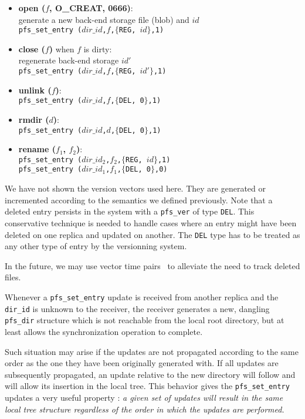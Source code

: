 \begin{itemize}
  \item \textbf{open ($f$, O\_CREAT, 0666)}: \\
    generate a new back-end storage file (blob) and $id$ \\
    {\tt pfs\_set\_entry ($dir\_id$,$f$,$\{$REG, $id$$\}$,1)}

  \item \textbf{close ($f$)} when $f$ is dirty: \\
    regenerate back-end storage $id'$ \\
    {\tt pfs\_set\_entry ($dir\_id$,$f$,$\{$REG, $id'$$\}$,1)}
    
  \item \textbf{unlink ($f$)}: \\
    {\tt pfs\_set\_entry ($dir\_id$,$f$,$\{$DEL, 0$\}$,1)}

  \item \textbf{rmdir ($d$)}: \\
    {\tt pfs\_set\_entry ($dir\_id$,$d$,$\{$DEL, 0$\}$,1)}

  \item \textbf{rename ($f_1$, $f_2$)}: \\
    {\tt pfs\_set\_entry ($dir\_id_2$,$f_2$,$\{$REG, $id$$\}$,1)} \\
    {\tt pfs\_set\_entry ($dir\_id_1$,$f_1$,$\{$DEL, 0$\}$,0)}
\end{itemize}

We have not shown the version vectors used here. They are generated or
incremented according to the semantics we defined previously. Note
that a deleted entry persists in the system with a \texttt{pfs\_ver}
of type {\tt DEL}\@.  This conservative technique is needed to handle
cases where an entry might have been deleted on one replica and
updated on another. The {\tt DEL} type has to be treated as any other
type of entry by the versionning system.


In the future, we may use
vector time pairs~\cite{cox:tra} to alleviate the need to track
deleted files.

Whenever a {\tt pfs\_set\_entry} update is received from another
replica and the {\tt dir\_id} is unknown to the receiver, the receiver
generates a new, dangling {\tt pfs\_dir} structure which is not
reachable from the local root directory, but at least allows the
synchronization operation to complete.

Such situation may arise if the updates are not propagated according
to the same order as the one they have been originally generated
with. If all updates are subsequently propagated, an update relative
to the new directory will follow and will allow its insertion in the
local tree. This behavior gives the {\tt pfs\_set\_entry} updates a
very useful property : \emph{a given set of updates will result in the
same local tree structure regardless of the order in which the updates
are performed.}

